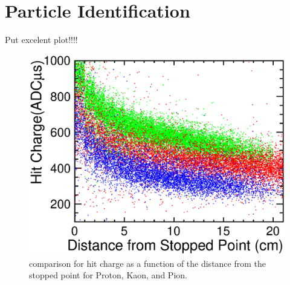 \section{Particle Identification}

Put excelent plot!!!!

\begin{figure}[!htb]
  \begin{center}
    \includegraphics[width=1.0\hsize]{fig/PIDresult.eps}
  \end{center}
  \caption{comparison for hit charge as a function of the distance from the stopped point for Proton, Kaon, and Pion.}
  \label{fig:PID}
\end{figure}
